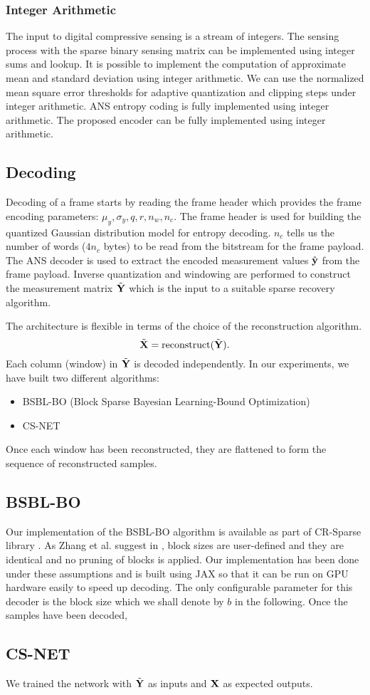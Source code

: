 \subsubsection{Integer Arithmetic}
The input to digital compressive sensing is a stream of integers.
The sensing process with
the sparse binary sensing matrix can be implemented
using integer sums and lookup.
It is possible to implement the computation of
approximate mean and standard deviation
using integer arithmetic.
We can use the normalized mean square error thresholds
for adaptive quantization and clipping steps under integer arithmetic.
ANS entropy coding is fully implemented using integer arithmetic.
The proposed encoder can be fully implemented using integer arithmetic.

\subsection{Decoding}
Decoding of a frame starts by reading the frame header
which provides the frame encoding parameters:
$\mu_y, \sigma_y, q, r, n_w, n_c$.
The frame header is used for building
the quantized Gaussian distribution model
for entropy decoding.
$n_c$ tells us the number of words ($4 n_c$ bytes) to be
read from the bitstream for the frame payload.
The ANS decoder is used to extract the encoded measurement
values $\hat{\mathbf{y}}$ from the frame payload.
Inverse quantization and windowing are performed
to construct the measurement matrix $\tilde{\mathbf{Y}}$
which is the input to a suitable sparse recovery algorithm.

The architecture is flexible in terms of the choice of the
reconstruction algorithm.
\begin{equation}
\tilde{\mathbf{X}} = \mathrm{reconstruct}(\tilde{\mathbf{Y}}).
\end{equation}
Each column (window) in $\tilde{\mathbf{Y}}$ is decoded independently.
In our experiments, we have built two different algorithms:
\begin{itemize}
  \item BSBL-BO (Block Sparse Bayesian Learning-Bound Optimization)
  \cite{zhang2013extension,zhang2012compressed,zhang2016comparison}
  \item CS-NET \cite{zhang2021csnet}
\end{itemize}
Once each window has been reconstructed, they are flattened
to form the sequence of reconstructed samples.

\subsection{BSBL-BO}
Our implementation of the BSBL-BO algorithm is available as part of
CR-Sparse library \cite{kumar2021cr}.
As Zhang et al. suggest in \cite{zhang2012compressed},
block sizes are user-defined and they are identical and
no pruning of blocks is applied. Our implementation has been
done under these assumptions and is built using JAX so that it can
be run on GPU hardware easily to speed up decoding.
The only configurable parameter for this decoder is the block size
which we shall denote by $b$ in the following.
Once the samples have been decoded,

\subsection{CS-NET}
We trained the network with $\tilde{\mathbf{Y}}$
as inputs and $\mathbf{X}$ as expected outputs.

